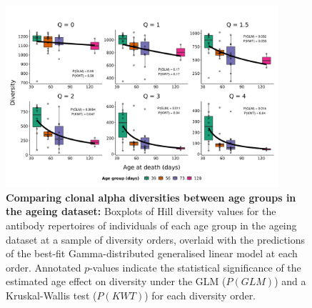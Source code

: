 \begin{figure}
\centering
\includegraphics[width = 0.9\textwidth]{_Figures/png/ageing-clone-diversity-solo-fit-gamma}
\caption[Comparing clonal alpha diversities between age groups in the \igseq ageing dataset]{\textbf{Comparing clonal alpha diversities between age groups in the \igseq ageing dataset:} Boxplots of Hill diversity values for the antibody repertoires of individuals of each age group in the \igseq ageing dataset at a sample of diversity orders, overlaid with the predictions of the best-fit Gamma-distributed generalised linear model at each order.  Annotated $p$-values indicate the statistical significance of the estimated age effect on diversity under the GLM ($P(GLM)$) and a Kruskal-Wallis test ($P(KWT)$) for each diversity order.}
\label{fig:igseq-ageing-clone-diversity-solo-fit-gamma}
\end{figure}

